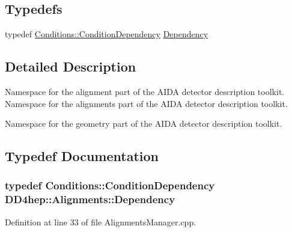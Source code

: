 \subsection*{Typedefs}
\begin{DoxyCompactItemize}
\item 
typedef \hyperlink{class_d_d4hep_1_1_conditions_1_1_condition_dependency}{Conditions::ConditionDependency} \hyperlink{namespace_d_d4hep_1_1_alignments_a94aaf200a47dbbcf42c8769eb623ea60}{Dependency}
\end{DoxyCompactItemize}


\subsection{Detailed Description}
Namespace for the alignment part of the AIDA detector description toolkit. Namespace for the alignments part of the AIDA detector description toolkit.

Namespace for the geometry part of the AIDA detector description toolkit. 

\subsection{Typedef Documentation}
\hypertarget{namespace_d_d4hep_1_1_alignments_a94aaf200a47dbbcf42c8769eb623ea60}{
\subsubsection[{Dependency}]{\setlength{\rightskip}{0pt plus 5cm}typedef {\bf Conditions::ConditionDependency} {\bf DD4hep::Alignments::Dependency}}}
\label{namespace_d_d4hep_1_1_alignments_a94aaf200a47dbbcf42c8769eb623ea60}


Definition at line 33 of file AlignmentsManager.cpp.